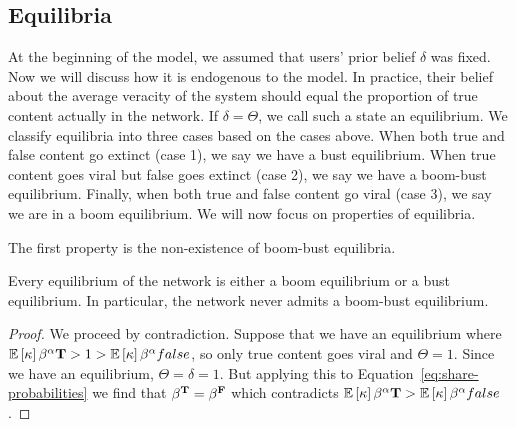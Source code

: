 \subsection{Equilibria} 

At the beginning of the model, we assumed that users' prior belief $\delta$ was fixed. Now we will discuss how it is endogenous to the model. In practice, their belief about the average veracity of the system should equal the proportion of true content actually in the network. If $\delta = \Theta$, we call such a state an equilibrium. We classify equilibria into three cases based on the cases above. When both true and false content go extinct (case 1), we say we have a bust equilibrium. When true content goes viral but false goes extinct (case 2), we say we have a boom-bust equilibrium. Finally, when both true and false content go viral (case 3), we say we are in a boom equilibrium.  We will now focus on properties of equilibria. 

The first property is the non-existence of boom-bust equilibria. 
\begin{theorem}
    Every equilibrium of the network is either a boom equilibrium or a bust equilibrium. In particular, the network never admits a boom-bust equilibrium. 
\end{theorem}
\begin{proof}
    We proceed by contradiction. Suppose that we have an equilibrium where $\mathbb{E}\left[ \kappa \right] \beta^{\alpha}{\mathbf{T}} > 1 > \mathbb{E}\left[ \kappa \right] \beta^{\alpha}{false}$, so only true content goes viral and $\Theta=1$. Since we have an equilibrium, $\Theta = \delta = 1$. But applying this to Equation~\eqref{eq:share-probabilities} we find that $\beta^{\mathbf{T}} = \beta^{\mathbf{F}}$ which contradicts $\mathbb{E}\left[ \kappa \right] \beta^{\alpha}{\mathbf{T}} >\mathbb{E}\left[ \kappa \right] \beta^{\alpha}{false}$. 
\end{proof}

